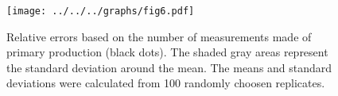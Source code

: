 \documentclass[12pt,a4paper]{scrartcl}
\begin{document}
\clearpage

\begin{figure}[h]
	\centering
	\texttt{[image: ../../../graphs/fig6.pdf]}
	\caption{Relative errors based on the number of measurements made of primary production (black dots). The shaded gray areas represent the standard deviation around the mean. The means and standard deviations were calculated from 100 randomly choosen replicates.}
\end{figure}
\end{document}

